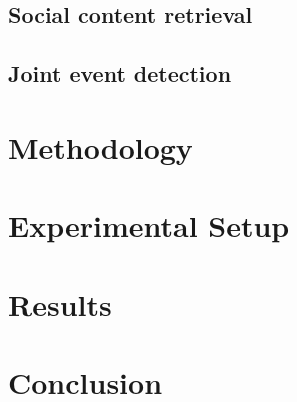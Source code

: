 \cite{zhao_interactive_2019}
\subsection{Social content retrieval}
\label{Social content retrieval}
\cite{suarez2018data}

\cite{ning_uncovering_2015}

\cite{tanev_enhancing_2012}

\cite{tsagkias_linking_2011}

\cite{danovitch2020linking}

\cite{wang_mining_2015}
\subsection{Joint event detection}
\label{Joint event detection}
\cite{thapen_early_2016}

\cite{hua_topical_2016}

\cite{mele_linking_2017}
\section{Methodology}
\section{Experimental Setup}
\section{Results}
\section{Conclusion}

